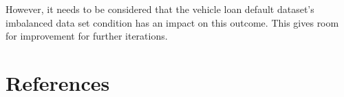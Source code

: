 \documentclass[a4paper,12pt]{article}
\numberwithin{equation}{section}
\begin{document}
   However, it needs to be considered that the vehicle loan default dataset's imbalanced data set condition has an impact on this outcome. This gives room for improvement for further iterations.





%
%

%
%

%
%


\newpage

%
%

\section{References}


\newpage

%
%




\end{document}
